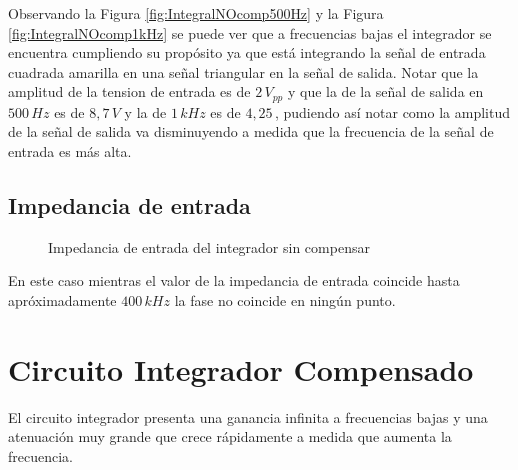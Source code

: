 Observando la Figura \ref{fig:IntegralNOcomp500Hz} y la Figura \ref{fig:IntegralNOcomp1kHz} se puede ver que a frecuencias bajas el integrador se encuentra cumpliendo su propósito ya que está integrando la señal de entrada cuadrada amarilla en una señal triangular en la señal de salida. Notar que la amplitud de la tension de entrada es de $2 \, V_{pp}$ y que la de la señal de salida en $500 \,Hz$ es de $8,7 \,V$ y la de $1 \,kHz$ es de $4,25 \,$, pudiendo así notar como la amplitud de la señal de salida va disminuyendo a medida que la frecuencia de la señal de entrada es más alta.

\subsection{Impedancia de entrada}
\begin{figure}[H]
	\begin{center}
		\caption{Impedancia de entrada del integrador sin compensar}
		\label{fig:zinsuperINTegrador}
	\end{center}
\end{figure}

En este caso mientras el valor de la impedancia de entrada coincide hasta apróximadamente $400 \, kHz$ la fase no coincide en ningún punto.


\section{Circuito Integrador Compensado}
El circuito integrador presenta una ganancia infinita a frecuencias bajas y una atenuación muy grande que crece rápidamente a medida que aumenta la frecuencia.

